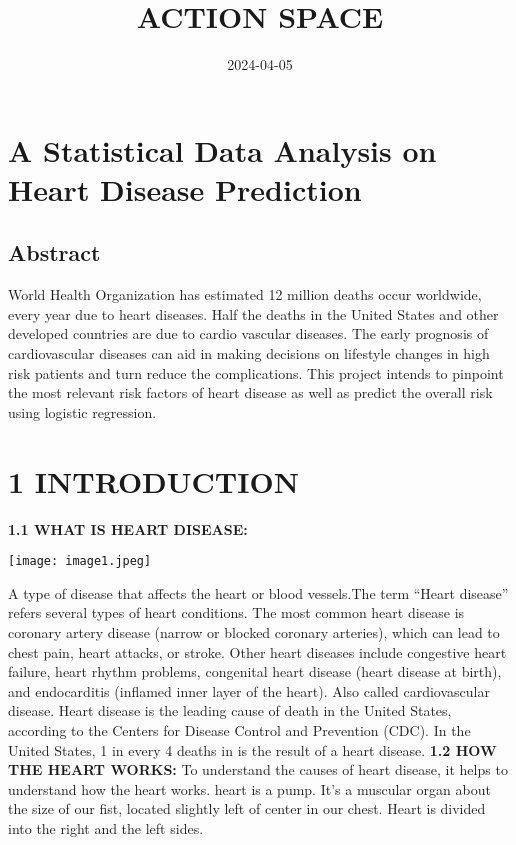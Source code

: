 \documentclass[
]{article}
\title{ACTION SPACE}
\author{}
\date{\vspace{-2.5em}2024-04-05}
\begin{document}
\maketitle

\hypertarget{a-statistical-data-analysis-on-heart-disease-prediction}{%
\section{A Statistical Data Analysis on Heart Disease
Prediction}\label{a-statistical-data-analysis-on-heart-disease-prediction}}

\hypertarget{abstract}{%
\subsection{Abstract}\label{abstract}}

World Health Organization has estimated 12 million deaths occur
worldwide, every year due to heart diseases. Half the deaths in the
United States and other developed countries are due to cardio vascular
diseases. The early prognosis of cardiovascular diseases can aid in
making decisions on lifestyle changes in high risk patients and turn
reduce the complications. This project intends to pinpoint the most
relevant risk factors of heart disease as well as predict the overall
risk using logistic regression.

\hypertarget{introduction}{%
\section{1 INTRODUCTION}\label{introduction}}

\textbf{1.1 WHAT IS HEART DISEASE:}

\texttt{[image: image1.jpeg]}

A type of disease that affects the heart or blood vessels.The term
``Heart disease'' refers several types of heart conditions. The most
common heart disease is coronary artery disease (narrow or blocked
coronary arteries), which can lead to chest pain, heart attacks, or
stroke. Other heart diseases include congestive heart failure, heart
rhythm problems, congenital heart disease (heart disease at birth), and
endocarditis (inflamed inner layer of the heart). Also called
cardiovascular disease. Heart disease is the leading cause of death in
the United States, according to the Centers for Disease Control and
Prevention (CDC). In the United States, 1 in every 4 deaths in is the
result of a heart disease. \textbf{1.2 HOW THE HEART WORKS:} To
understand the causes of heart disease, it helps to understand how the
heart works. heart is a pump. It's a muscular organ about the size of
our fist, located slightly left of center in our chest. Heart is divided
into the right and the left sides.
\end{document}
